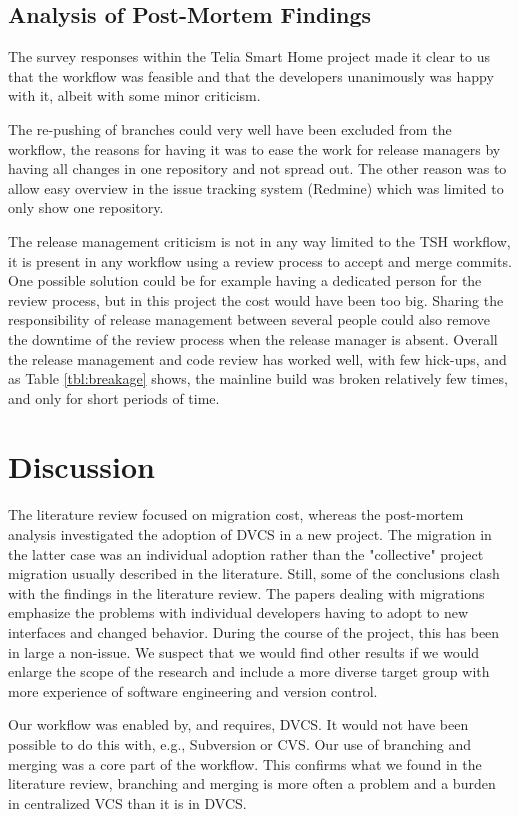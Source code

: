 \documentclass{llncs}
\begin{document}
\subsection{Analysis of Post-Mortem Findings}
The survey responses within the Telia Smart Home project made it clear
to us that the workflow was feasible and that the developers
unanimously was happy with it, albeit with some minor criticism.

The re-pushing of branches could very well have been excluded from the
workflow, the reasons for having it was to ease the work for release
managers by having all changes in one repository and not spread
out. The other reason was to allow easy overview in the issue tracking
system (Redmine) which was limited to only show one repository.

The release management criticism is not in any way limited to the TSH
workflow, it is present in any workflow using a review process to
accept and merge commits. One possible solution could be for example
having a dedicated person for the review process, but in this project
the cost would have been too big. Sharing the responsibility of
release management between several people could also remove the
downtime of the review process when the release manager is
absent. Overall the release management and code review has worked
well, with few hick-ups, and as Table \ref{tbl:breakage} shows, the
mainline build was broken relatively few times, and only for short
periods of time.

\section{Discussion}

The literature review focused on migration cost, whereas the
post-mortem analysis investigated the adoption of DVCS in a new
project. The migration in the latter case was an individual adoption
rather than the "collective" project migration usually described in
the literature. Still, some of the conclusions clash with the findings
in the literature review. The papers dealing with migrations
emphasize the problems with individual developers having to adopt to
new interfaces and changed behavior. During the course of the project,
this has been in large a non-issue. We suspect that we would find
other results if we would enlarge the scope of the research and
include a more diverse target group with more experience of software
engineering and version control.

Our workflow was enabled by, and requires, DVCS. It would not have
been possible to do this with, e.g., Subversion or CVS. Our use of
branching and merging was a core part of the workflow. This confirms
what we found in the literature review, branching and merging is more
often a problem and a burden in centralized VCS than it is in DVCS.
\end{document}
